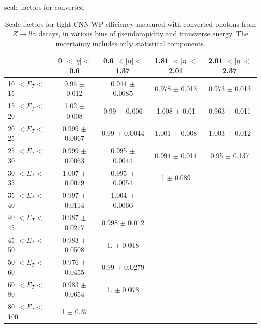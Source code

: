 \begin{frame}{scale factors for converted}
\begin{table}[htbp]
    \centering
   \begin{tabular}{lcccc}
   \hline\hline
     & 0 $ < |\eta| < $ 0.6 & 0.6 $ < |\eta| < $ 1.37 & 1.81 $ < |\eta| < $ 2.01  & 2.01 $ < |\eta| < $ 2.37 \\
    \hline
10 $ < E_T < $ 15   & 0.96 $\pm$ 0.012   & 0.944 $\pm$ 0.0085 & 0.978 $\pm$ 0.013  & 0.973 $\pm$ 0.013\\
15 $ < E_T < $ 20   & 1.02 $\pm$ 0.008   & 0.99  $\pm$ 0.006  & 1.008 $\pm$ 0.01   & 0.963 $\pm$ 0.011\\
20 $ < E_T < $ 25   & 0.999 $\pm$ 0.0067 & 0.99  $\pm$ 0.0044 & 1.001 $\pm$ 0.008  & 1.003 $\pm$ 0.012\\
25 $ < E_T < $ 30   & 0.999 $\pm$ 0.0063 & 0.995 $\pm$ 0.0044 & 0.994 $\pm$ 0.014  & 0.95  $\pm$ 0.137\\
30 $ < E_T < $ 35   & 1.007 $\pm$ 0.0079 & 0.995 $\pm$ 0.0054 & 1     $\pm$ 0.089  & \\
35 $ < E_T < $ 40   & 0.997 $\pm$ 0.0114 & 1.004 $\pm$ 0.0066 &                    & \\
40 $ < E_T < $ 45   & 0.987 $\pm$ 0.0277 & 0.998 $\pm$ 0.012  &                    & \\
45 $ < E_T < $ 50   & 0.983 $\pm$ 0.0508 & 1.    $\pm$ 0.018  &                    & \\
50 $ < E_T < $ 60   & 0.976 $\pm$ 0.0455 & 0.99  $\pm$ 0.0279 &                    & \\
60 $ < E_T < $ 80   & 0.983 $\pm$ 0.0654 & 1.    $\pm$ 0.078  &                    & \\
80 $ < E_T < $ 100  & 1     $\pm$ 0.37   &                    &                    & \\
\hline\hline
\end{tabular}
\caption{Scale factors for tight CNN WP efficiency measured with converted photons from $Z\rightarrow ll\gamma$ decays, in various bins of pseudorapidity and transverse energy. The uncertainty includes only statistical components.}
\end{table}    
\end{frame}

